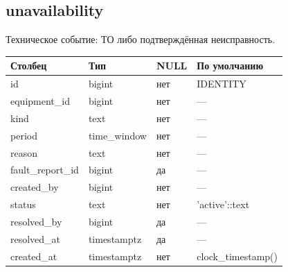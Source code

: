 \par\noindent\begin{minipage}{\linewidth}
\subsection{unavailability}
Техническое событие: ТО либо подтверждённая неисправность.\par\smallskip\noindent
\begin{tabular}{p{}p{}p{}p{}}
\toprule Столбец & Тип & NULL & По умолчанию \\ \midrule
id & bigint & нет & IDENTITY \\
equipment\_\allowbreak{}id & bigint & нет & — \\
kind & text & нет & — \\
period & time\_\allowbreak{}window & нет & — \\
reason & text & нет & — \\
fault\_\allowbreak{}report\_\allowbreak{}id & bigint & да & — \\
created\_\allowbreak{}by & bigint & нет & — \\
status & text & нет & 'active'::text \\
resolved\_\allowbreak{}by & bigint & да & — \\
resolved\_\allowbreak{}at & timestamptz & да & — \\
created\_\allowbreak{}at & timestamptz & нет & clock\_\allowbreak{}timestamp() \\
\bottomrule\end{tabular}\end{minipage}\par
